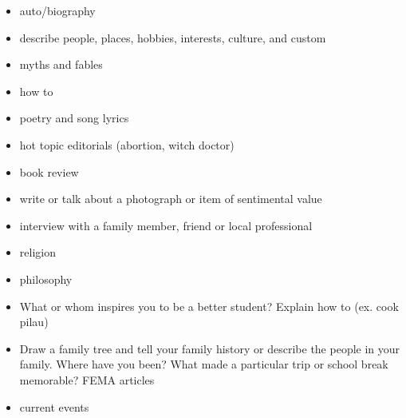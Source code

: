 \documentclass[12pt,a4paper]{report}
\begin{document}
\begin{itemize}
\item{auto/biography}
\item{describe people, places, hobbies, interests, culture, and custom}
\item{myths and fables}
\item{how to}
\item{poetry and song lyrics}
\item{hot topic editorials (abortion, witch doctor)}
\item{book review}
\item{write or talk about a photograph or item of sentimental value}
\item{interview with a family member, friend or local professional}
\item{religion}
\item{philosophy}
\item{What or whom inspires you to be a better student? Explain how to (ex. cook pilau)}
\item{Draw a family tree and tell your family history or describe the people in your family. Where have you been? What made a particular trip or school break memorable? FEMA articles}
\item{current events}
\end{itemize}
\end{document}
